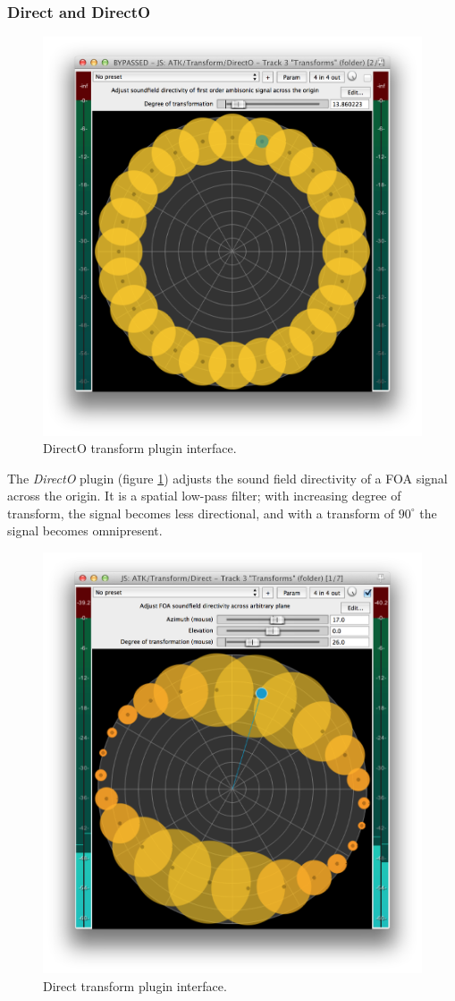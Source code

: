 \documentclass{article}
\begin{document}
\subsubsection{Direct and DirectO}\label{sec:direct}

\begin{figure}[h]
\captionsetup{aboveskip=-6pt}
\centering
\includegraphics[width=0.8\columnwidth]{figures/directOTransform.png}
\caption{DirectO transform plugin interface.\label{fig:directOTransform}}
\end{figure}

The \emph{DirectO} plugin (figure \ref{fig:directOTransform}) adjusts the sound field directivity of a FOA signal across the origin.
It is a spatial low-pass filter; with increasing degree of transform, the signal becomes less directional, and with a transform of $90^{\circ}$ the signal becomes omnipresent.
  
\begin{figure}[h]
\captionsetup{aboveskip=-6pt}
\centering
\includegraphics[width=0.8\columnwidth]{figures/directTransform.png}
\caption{Direct transform plugin interface.\label{fig:directTransform}}
\end{figure}
\end{document}
